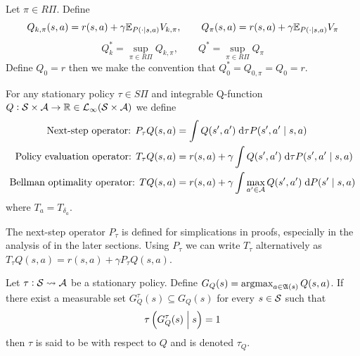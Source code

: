 \begin{defn}
  Let $\pi \in R\Pi$.
  Define
  \[ Q_{k, \pi}(s, a) = r(s, a) + \gamma \mathbb{E}_{P(\cdot \mid s, a)} V_{k, \pi}
  ,\qquad Q_\pi(s, a) = r(s, a) + \gamma \mathbb{E}_{P(\cdot \mid s, a)} V_\pi \]
  \[ Q^*_k = \sup_{\pi \in R\Pi} Q_{k, \pi}
  , \qquad Q^* = \sup_{\pi \in R\Pi} Q_\pi \]
  Define $Q_0 = r$ then we make the convention that
  $Q^*_0 = Q_{0,\pi} = Q_0 = r$.
  \label{defn:polEvalQ}
\end{defn}

\begin{defn}
  For any stationary policy $\tau \in S\Pi$ and
  integrable Q-function $Q:\mathcal{S} \times \mathcal{A} \to \mathbb{R}
  \in \mathcal{L}_\infty(\mathcal{S} \times \mathcal{A})$ we define
  \begin{align*}
    \text{Next-step operator: }
    P_\tau Q(s, a) &= \int Q(s', a') \; \mathrm{d} \tau P(s', a' \mid s, a)
    \\ \text{Policy evaluation operator: }
    T_\tau Q(s, a) &= 
    r(s, a) + \gamma \int Q(s', a') \; \mathrm{d} \tau P(s', a' \mid s, a)
    \\ \text{Bellman optimality operator: }
      T Q(s, a) &= r(s, a) + \gamma
    \int \max_{a' \in \mathcal{A}} Q(s', a') \; \mathrm{d} P(s' \mid s, a)
  \end{align*}
  where $T_a = T_{\delta_a}$.
  \label{defn:opQ}
\end{defn}
\begin{rem}
  The next-step operator $P_\tau$
  is defined for simplications in proofs, especially
  in the analysis of  in the later sections.
  Using $P_\tau$ we can write $T_\tau$ alternatively as
  $T_\tau Q(s, a) = r(s, a) + \gamma P_\tau Q (s, a)$.
\end{rem}
\begin{defn}
  Let $\tau : \mathcal{S} \leadsto \mathcal{A}$ be a stationary policy. Define
  $G_Q(s) = \operatorname*{argmax}_{a \in \frak{A}(s)} Q(s, a)$.
  If there exist a measurable set $G_Q^\tau(s) \subseteq G_Q(s)$
  for every $s \in \mathcal{S}$ such that
  \[ \tau \left( G_Q^\tau(s) \;\middle\vert\; s \right) = 1 \]
  then $\tau$ is said to be  with respect to $Q$ and is
  denoted $\tau_Q$.
  \label{defn:greedyQ}
\end{defn}

